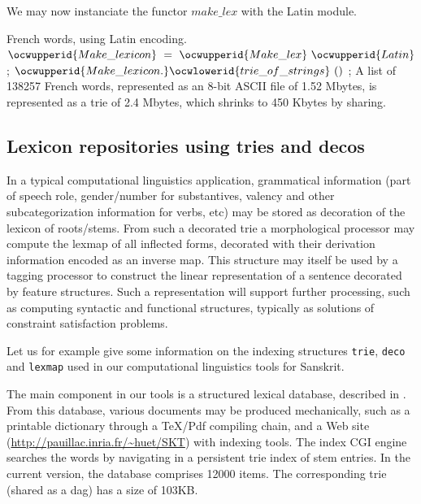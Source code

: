 \documentclass[12pt]{article}
\begin{document}
We may now instanciate the functor $make\_lex$ with the Latin module.




\label{../ML/make_french_lexicon.ml:0}%
French words, using Latin encoding. 
\ocweol
\label{../ML/make_french_lexicon.ml:784}%
\medskip
\ocwbegincode{}\ocwindent{0.00em}
~$\ocwupperid{Make\_lexicon}~=~\ocwupperid{Make\_lex}~\ocwupperid{Latin}$\ocweol
\ocwindent{0.00em}
;\ocweol
\ocwindent{0.00em}
$\ocwupperid{Make\_lexicon.}\ocwlowerid{trie\_of\_strings}~()$\ocweol
\ocwindent{0.00em}
;\ocweol
\ocwendcode{}A list of 138257 French words, represented as an 8-bit ASCII file of 1.52
Mbytes, is represented as a trie of 2.4 Mbytes, which shrinks to 450
Kbytes by sharing. 

\subsection{Lexicon repositories using tries and decos}

In a typical computational linguistics application, grammatical information
(part of speech role, gender/number for substantives, valency and other
subcategorization information for verbs, etc) may be stored as 
decoration of the lexicon of roots/stems. From such a decorated trie
a morphological processor may compute the lexmap of all inflected forms,
decorated with their derivation information encoded as an inverse map.
This structure may itself be used by a tagging processor 
to construct the linear representation of a 
sentence decorated by feature structures. Such a representation
will support further processing, such as computing
syntactic and functional structures, typically as solutions of
constraint satisfaction problems. 

Let us for example give some information on the indexing structures 
\verb|trie|, \verb|deco| and \verb|lexmap| used
in our computational linguistics tools for Sanskrit.

The main component in our tools is a structured lexical database,
described in \cite{dico-report,wcre}. From this database,
various documents may be produced mechanically, such as a
printable dictionary through a {\TeX}/Pdf 
compiling chain,
and a Web site (\url{http://pauillac.inria.fr/~huet/SKT}) 
with indexing tools. The index CGI engine searches the words
by navigating in a persistent trie index of stem entries. In the current 
version, the database comprises 12000 items.
The corresponding trie (shared as a dag) has a size of 103KB. 
\end{document}
